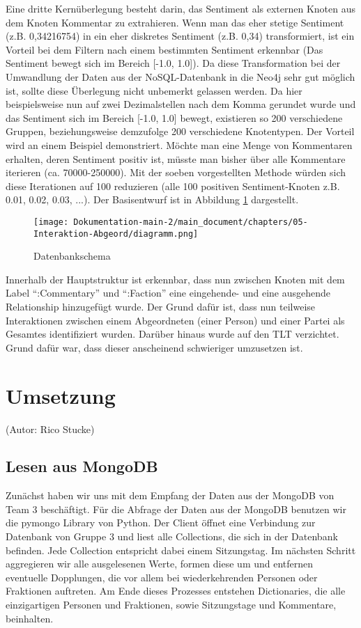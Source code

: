 \newline
Eine dritte Kernüberlegung besteht darin, das Sentiment als externen Knoten aus dem Knoten Kommentar zu extrahieren. Wenn man das eher stetige Sentiment (z.B. 0,34216754) in ein eher diskretes Sentiment (z.B. 0,34) transformiert, ist ein Vorteil bei dem Filtern nach einem bestimmten Sentiment erkennbar (Das Sentiment bewegt sich im Bereich [-1.0, 1.0]). Da diese Transformation bei der Umwandlung der Daten aus der NoSQL-Datenbank in die Neo4j sehr gut möglich ist, sollte diese Überlegung nicht unbemerkt gelassen werden. Da hier beispielsweise nun auf zwei Dezimalstellen nach dem Komma gerundet wurde und das Sentiment sich im Bereich [-1.0, 1.0] bewegt, existieren so 200 verschiedene Gruppen, beziehungsweise demzufolge 200 verschiedene Knotentypen. Der Vorteil wird an einem Beispiel demonstriert. Möchte man eine Menge von Kommentaren erhalten, deren Sentiment positiv ist, müsste man bisher über alle Kommentare iterieren (ca. 70000-250000). Mit der soeben vorgestellten Methode würden sich diese Iterationen auf 100 reduzieren (alle 100 positiven Sentiment-Knoten z.B. 0.01, 0.02, 0.03, ...). Der Basisentwurf ist in Abbildung \ref{fig:Dokumentation-main-2/muster_for_teams/chapters/04-Abgeordnete/image9.png} dargestellt.
\begin{figure}[htb]
    \centering
    \texttt{[image: Dokumentation-main-2/main\_document/chapters/05-Interaktion-Abgeord/diagramm.png]} 
    \caption{Datenbankschema}
    \label{fig:Dokumentation-main-2/muster_for_teams/chapters/04-Abgeordnete/image9.png}
\end{figure}
Innerhalb der Hauptstruktur ist erkennbar, dass nun zwischen Knoten mit dem Label \enquote{:Commentary} und \enquote{:Faction} eine eingehende- und eine ausgehende Relationship hinzugefügt wurde. Der Grund dafür ist, dass nun teilweise Interaktionen zwischen einem Abgeordneten (einer Person) und einer Partei als Gesamtes identifiziert wurden. Darüber hinaus wurde auf den TLT verzichtet. Grund dafür war, dass dieser anscheinend schwieriger umzusetzen ist.
\section{Umsetzung}\label{sec:04_03_umsetzung}
(Autor: Rico Stucke)
\subsection{Lesen aus MongoDB}
Zunächst haben wir uns mit dem Empfang der Daten aus der MongoDB von Team 3 beschäftigt. Für die Abfrage der Daten aus der MongoDB benutzen wir die pymongo Library von Python. Der Client öffnet eine Verbindung zur Datenbank von Gruppe 3 und liest alle Collections, die sich in der Datenbank befinden. Jede Collection entspricht dabei einem Sitzungstag. Im nächsten Schritt aggregieren wir alle ausgelesenen Werte, formen diese um und entfernen eventuelle Dopplungen, die vor allem bei wiederkehrenden Personen oder Fraktionen auftreten. Am Ende dieses Prozesses entstehen Dictionaries, die alle einzigartigen Personen und Fraktionen, sowie Sitzungstage und Kommentare, beinhalten.

